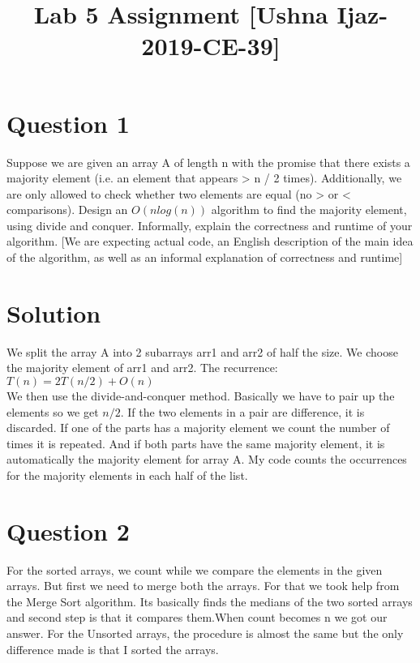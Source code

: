 \documentclass[12pt]{article}
\begin{document}
\title{Lab 5 Assignment [Ushna Ijaz- 2019-CE-39]}
\maketitle

\section*{Question 1}
Suppose we are given an array A of length n with the promise that
there exists a majority element (i.e. an element that appears > n / 2 times). Additionally,
we are only allowed to check whether two elements are equal (no > or < comparisons).
Design an $O(nlog(n))$ algorithm to find the majority element, using divide and conquer.
Informally, explain the correctness and runtime of your algorithm. [We are expecting
actual code, an English description of the main idea of the algorithm, as well as an informal
explanation of correctness and runtime] \\



\section*{Solution}

We split the array A into 2 subarrays arr1 and arr2 of half the size. We choose the majority element of arr1
and arr2. The recurrence:\\

$T(n) = 2T(n/2)+O(n)$ \\

We then use the divide-and-conquer method. Basically we have to pair up the elements so we get $n/2$. If the two elements in a pair are difference, it is discarded.
If one of the parts has a majority element we count the  number of times it is repeated. And if both parts have the same majority element, it is automatically the majority element for array A. My code counts the occurrences for the majority elements in each half of the list. \\


\section*{Question 2}

For the sorted arrays, we count while we compare the elements in the given arrays. But first we need to merge both the arrays. For that we took help from the Merge Sort algorithm. Its basically finds the medians of the two sorted arrays and second step is that it compares them.When count becomes n we got our answer. For the Unsorted arrays, the procedure is almost the same but the only difference made is that I sorted the arrays.  
\end{document}
